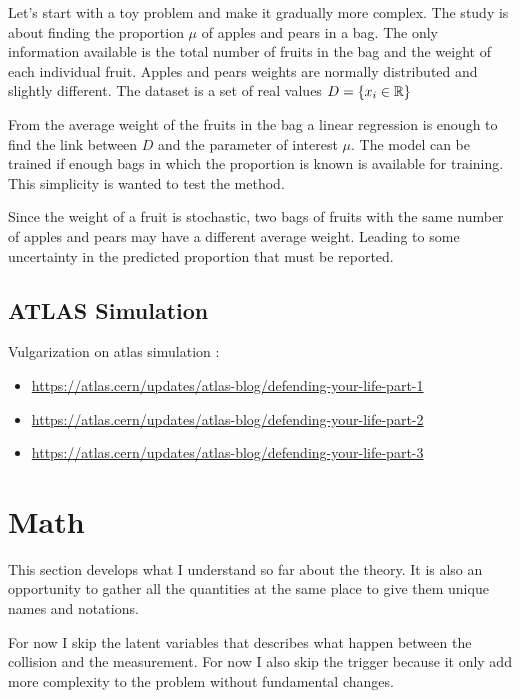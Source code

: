Let's start with a toy problem and make it gradually more complex.
The study is about finding the proportion $\mu$ of apples and pears in a bag.
The only information available is the total number of fruits in the bag and the weight of each individual fruit.
Apples and pears weights are normally distributed and slightly different.
The dataset is a set of real values $D = \{ x_i \in \mathbb{R} \} $

From the average weight of the fruits in the bag a linear regression is enough to find the link between $D$ and the parameter of interest $\mu$.
The model can be trained if enough bags in which the proportion is known is available for training.
This simplicity is wanted to test the method.

Since the weight of a fruit is stochastic, two bags of fruits with the same number of apples and pears may have a different average weight.
Leading to some uncertainty in the predicted proportion that must be reported.


\subsection{ATLAS Simulation} %
\label{sub:atlas_simulation}


Vulgarization on atlas simulation :
\begin{itemize}
	\item \url{https://atlas.cern/updates/atlas-blog/defending-your-life-part-1}
	\item \url{https://atlas.cern/updates/atlas-blog/defending-your-life-part-2}
	\item \url{https://atlas.cern/updates/atlas-blog/defending-your-life-part-3}
\end{itemize}




\section{Math} %
\label{sec:math}

This section develops what I understand so far about the theory.
It is also an opportunity to gather all the quantities at the same place to give them unique names and notations.

For now I skip the latent variables that describes what happen between the collision and the measurement.
For now I also skip the trigger because it only add more complexity to the problem without fundamental changes.


